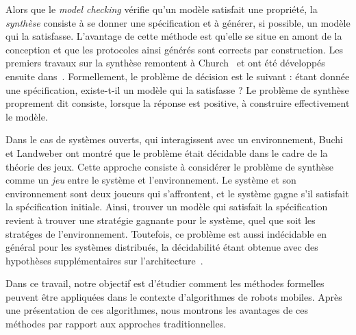 Alors que le \emph{model checking} vérifie qu'un modèle satisfait une
propriété, la \emph{synthèse} consiste à se donner une spécification
et à générer, si possible, un modèle qui la satisfasse. 
L'avantage de cette méthode est qu'elle se situe en amont de la
conception et que les protocoles ainsi générés sont corrects par
construction.  Les premiers travaux sur la synthèse remontent à
Church~\cite{Church62} et ont été développés ensuite
dans~\cite{BuchiLandweber69,emersonclarke1981,
  MannaWolper84,PnueliR90}.
Formellement, le problème de décision est le suivant : étant donnée
une spécification, existe-t-il un modèle qui la satisfasse ? Le
problème de synthèse proprement dit consiste, lorsque la réponse est
positive, à construire effectivement le modèle.

Dans le cas de systèmes ouverts, qui interagissent avec un
environnement, Buchi et Landweber \cite{BuchiLandweber69} ont montré
que le problème était décidable dans le cadre de la théorie des jeux.
Cette approche consiste à considérer le problème de synthèse comme un
\emph{jeu} entre le système et l'environnement. Le système et son
environnement sont deux joueurs qui s'affrontent, et le système gagne
s'il satisfait la spécification initiale. Ainsi, trouver un modèle qui
satisfait la spécification revient à trouver une stratégie gagnante
pour le système, quel que soit les stratéges de l'environnement.
Toutefois, ce problème est aussi indécidable en général pour les
systèmes distribués, la décidabilité étant obtenue avec des
hypothèses supplémentaires sur l'architecture~\cite{PnueliR90}.

Dans ce travail, notre objectif est d'étudier comment les méthodes
formelles peuvent être appliquées dans le contexte d'algorithmes de
robots mobiles.  Après une présentation de ces algorithmes, nous
montrons les avantages de ces méthodes par rapport aux approches
traditionnelles.



